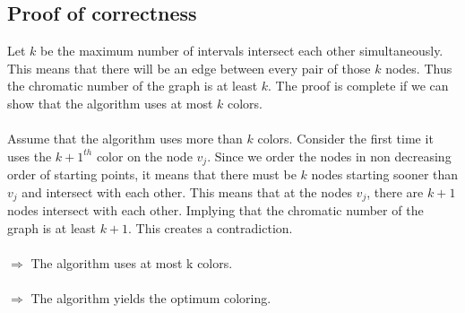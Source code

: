 \documentclass{article}
\begin{document}
\subsection*{Proof of correctness}
Let $k$ be the maximum number of intervals intersect each other simultaneously. This means that there will be an edge between every pair of those $k$ nodes. Thus the chromatic number of the graph is at least $k$. The proof is complete if we can show that the algorithm uses at most $k$ colors. \\\\
Assume that the algorithm uses more than $k$ colors. Consider the first time it uses the $k+1^{th}$ color on the node $v_{j}$. Since we order the nodes in non decreasing order of starting points, it means that there must be $k$ nodes starting sooner than $v_{j}$ and intersect with each other. This means that at the nodes $v_{j}$, there are $k+1$ nodes intersect with each other. Implying that the chromatic number of the graph is at least $k+1$. This creates a contradiction. \\\\
$\Rightarrow$ The algorithm uses at most k colors. \\\\
$\Rightarrow$ The algorithm yields the optimum coloring.

\pagebreak
\end{document}
